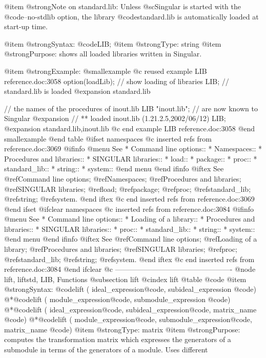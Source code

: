 {@item @strong{Note on standard.lib:}
Unless  @sc{Singular} is started with the @code{--no-stdlib} option, the
library @code{standard.lib} is automatically loaded at start-up time.

@item @strong{Syntax:}
@code{LIB;}
@item @strong{Type:}
string
@item @strong{Purpose:}
shows all loaded libraries written in Singular.


@item @strong{Example:}
@smallexample
@c reused example LIB reference.doc:3058 
  option(loadLib); // show loading of libraries
  LIB;             // standard.lib is loaded
@expansion{} standard.lib

                   // the names of the procedures of inout.lib
  LIB "inout.lib"; // are now known to Singular
@expansion{} // ** loaded inout.lib (1.21.2.5,2002/06/12)
  LIB;
@expansion{} standard.lib,inout.lib
@c end example LIB reference.doc:3058
@end smallexample
@end table
@ifset namespaces
@c inserted refs from reference.doc:3069
@ifinfo
@menu
See
* Command line options::
* Namespaces::
* Procedures and libraries::
* SINGULAR libraries::
* load::
* package::
* proc::
* standard_lib::
* string::
* system::
@end menu
@end ifinfo
@iftex
See
@ref{Command line options};
@ref{Namespaces};
@ref{Procedures and libraries};
@ref{SINGULAR libraries};
@ref{load};
@ref{package};
@ref{proc};
@ref{standard_lib};
@ref{string};
@ref{system}.
@end iftex
@c end inserted refs from reference.doc:3069
@end ifset
@ifclear namespaces
@c inserted refs from reference.doc:3084
@ifinfo
@menu
See
* Command line options::
* Loading of a library::
* Procedures and libraries::
* SINGULAR libraries::
* proc::
* standard_lib::
* string::
* system::
@end menu
@end ifinfo
@iftex
See
@ref{Command line options};
@ref{Loading of a library};
@ref{Procedures and libraries};
@ref{SINGULAR libraries};
@ref{proc};
@ref{standard_lib};
@ref{string};
@ref{system}.
@end iftex
@c end inserted refs from reference.doc:3084
@end ifclear
@c -------------------------------------------------
@node lift, liftstd, LIB, Functions
@subsection lift
@cindex lift
@table @code
@item @strong{Syntax:}
@code{lift (} ideal_expression@code{,} subideal_expression @code{)}
@*@code{lift (} module_expression@code{,} submodule_expression @code{)}
@*@code{lift (} ideal_expression@code{,} subideal_expression@code{,} matrix_name @code{)}
@*@code{lift (} module_expression@code{,} submodule_expression@code{,} matrix_name @code{)}
@item @strong{Type:}
matrix
@item @strong{Purpose:}
computes the transformation matrix which expresses the generators of a
submodule in terms of the generators of a module.  Uses different
}
